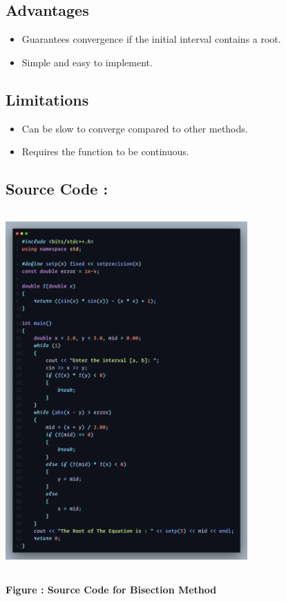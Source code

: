 \documentclass{scrreprt}
\begin{document}
\subsection*{Advantages}

\begin{itemize}
    \item Guarantees convergence if the initial interval contains a root.
    \item Simple and easy to implement.
\end{itemize}

\subsection*{Limitations}

\begin{itemize}
    \item Can be slow to converge compared to other methods.
    \item Requires the function to be continuous.
\end{itemize}

\subsection*{Source Code : }
\begin{center}
    {\includegraphics[width=350px, height=520px]{bisection_code.png}}
    \parbox{0.8\textwidth}{ 
        \centering
        \textbf{Figure : Source Code for Bisection Method}
    }
\end{center}
\newpage
\end{document}
